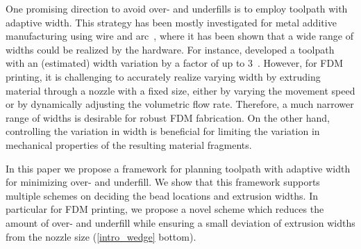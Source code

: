 One promising direction to avoid over- and underfills is to employ toolpath with adaptive width. 
This strategy has been mostly investigated for metal additive manufacturing using wire and arc~\cite{Ding2014,Xiong2019}, where it has been shown that a wide range of widths could be realized by the hardware. 
For instance, \citeauthor{Ding2016a} developed a toolpath with an (estimated) width variation by a factor of up to $3$~\cite{Ding2016a}.
However, for FDM printing, it is challenging to accurately realize varying width by extruding material through a nozzle with a fixed size, either by varying the movement speed or by dynamically adjusting the volumetric flow rate. 
Therefore, a much narrower range of widths is desirable for robust FDM fabrication.
On the other hand, controlling the variation in width is beneficial for limiting the variation in mechanical properties of the resulting material fragments. 

In this paper we propose a framework for planning toolpath with adaptive width for minimizing over- and underfill. 
We show that this framework supports multiple schemes on deciding the bead locations and extrusion widths. 
In particular for FDM printing, we propose a novel scheme which reduces the amount of over- and underfill while ensuring a small deviation of extrusion widths from the nozzle size (\cref{intro_wedge} bottom). 

